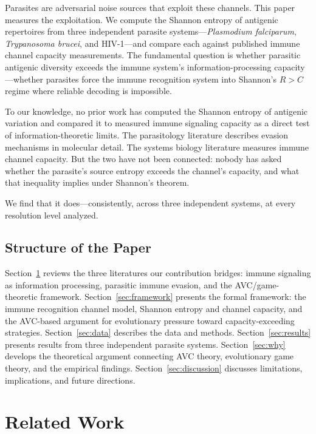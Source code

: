 \documentclass[twocolumn,10pt]{article}
\begin{document}
Parasites are adversarial noise sources that exploit these channels.  This paper measures the exploitation.  We compute the Shannon entropy of antigenic repertoires from three independent parasite systems---\textit{Plasmodium falciparum}, \textit{Trypanosoma brucei}, and HIV-1---and compare each against published immune channel capacity measurements.  The fundamental question is whether parasitic antigenic diversity exceeds the immune system's information-processing capacity---whether parasites force the immune recognition system into Shannon's $R > C$ regime where reliable decoding is impossible.

To our knowledge, no prior work has computed the Shannon entropy of antigenic variation and compared it to measured immune signaling capacity as a direct test of information-theoretic limits.  The parasitology literature describes evasion mechanisms in molecular detail.  The systems biology literature measures immune channel capacity.  But the two have not been connected: nobody has asked whether the parasite's source entropy exceeds the channel's capacity, and what that inequality implies under Shannon's theorem.

We find that it does---consistently, across three independent systems, at every resolution level analyzed.

\subsection{Structure of the Paper}

Section~\ref{sec:related} reviews the three literatures our contribution bridges: immune signaling as information processing, parasitic immune evasion, and the AVC/game-theoretic framework.  Section~\ref{sec:framework} presents the formal framework: the immune recognition channel model, Shannon entropy and channel capacity, and the AVC-based argument for evolutionary pressure toward capacity-exceeding strategies.  Section~\ref{sec:data} describes the data and methods.  Section~\ref{sec:results} presents results from three independent parasite systems.  Section~\ref{sec:why} develops the theoretical argument connecting AVC theory, evolutionary game theory, and the empirical findings.  Section~\ref{sec:discussion} discusses limitations, implications, and future directions.

\section{Related Work}
\label{sec:related}
\end{document}

